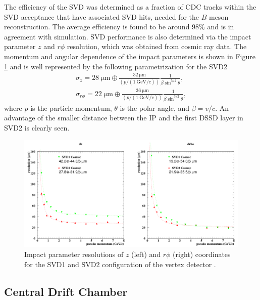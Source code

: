 \documentclass[headings=standardclasses,headings=big,oneside,a4paper,openany,12pt]{scrbook}
\newcommand {\e}[1]{\mathrm{~#1}}
\begin{document}
The efficiency of the SVD was determined as a fraction of CDC tracks within the SVD acceptance that have associated SVD hits, needed for the $B$ meson reconstruction. The average efficiency is found to be around $98\%$ and is in agreement with simulation. SVD performance is also determined via the impact parameter $z$ and $r\phi$ resolution, which was obtained from cosmic ray data. The momentum and angular dependence of the impact parameters is shown in Figure \ref{fig:SVD_performance} and is well represented by the following parametrization for the SVD2
\begin{align}
\sigma_z = 28\e{\mu m}\oplus \frac{32\e{\mu m}}{\left(p/(1\e{GeV}/c)\right)}\frac{1}{\beta \sin^{5/2}\theta},\\
\sigma_{r\phi} = 22\e{\mu m}\oplus \frac{36\e{\mu m}}{\left(p/(1\e{GeV}/c)\right)}\frac{1}{\beta \sin^{3/2}\theta},
\end{align}
where $p$ is the particle momentum, $\theta$ is the polar angle, and $\beta=v/c$. An advantage of the smaller distance between the IP and the first DSSD layer in SVD2 is clearly seen.

\begin{figure}[H]
	\centering
	\captionsetup{width=0.8\linewidth}
	\includegraphics[width=\linewidth]{fig/setup/SVD_performance_1}
	\caption{Impact parameter resolutions of $z$ (left) and $r\phi$ (right) coordinates for the SVD1 and SVD2 configuration of the vertex detector \cite{haba2004letter}.}
	\label{fig:SVD_performance}
\end{figure}


\subsection{Central Drift Chamber}
\end{document}
